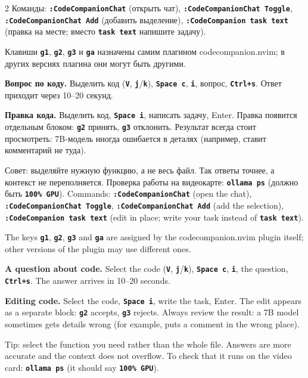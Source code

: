 \documentclass[10pt]{article}
\newcommand{\RU}{\selectlanguage{russian}}
\newcommand{\EN}{\selectlanguage{english}}
\newcommand{\key}[1]{\texttt{\bfseries #1}}
\begin{document}
\begin{paracol}{2}
\RU
Команды: \key{:CodeCompanionChat} (открыть чат), \key{:CodeCompanionChat Toggle}, \key{:CodeCompanionChat Add} (добавить выделение), \key{:CodeCompanion task text} (правка на месте; вместо \key{task text} напишите задачу).

Клавиши \key{g1}, \key{g2}, \key{g3} и \key{ga} назначены самим плагином codecompanion.nvim; в других версиях плагина они могут быть другими.

\textbf{Вопрос по коду.} Выделить код (\key{V}, \key{j}/\key{k}), \key{Space c}, \key{i}, вопрос, \key{Ctrl+s}. Ответ приходит через 10--20 секунд.

\textbf{Правка кода.} Выделить код, \key{Space i}, написать задачу, Enter. Правка появится отдельным блоком: \key{g2} принять, \key{g3} отклонить. Результат всегда стоит просмотреть: 7B-модель иногда ошибается в деталях (например, ставит комментарий не туда).

Совет: выделяйте нужную функцию, а не весь файл. Так ответы точнее, а контекст не переполняется. Проверка работы на видеокарте: \key{ollama ps} (должно быть \key{100\% GPU}).
\switchcolumn
\EN
Commands: \key{:CodeCompanionChat} (open the chat), \key{:CodeCompanionChat Toggle}, \key{:CodeCompanionChat Add} (add the selection), \key{:CodeCompanion task text} (edit in place; write your task instead of \key{task text}).

The keys \key{g1}, \key{g2}, \key{g3} and \key{ga} are assigned by the codecompanion.nvim plugin itself; other versions of the plugin may use different ones.

\textbf{A question about code.} Select the code (\key{V}, \key{j}/\key{k}), \key{Space c}, \key{i}, the question, \key{Ctrl+s}. The answer arrives in 10--20 seconds.

\textbf{Editing code.} Select the code, \key{Space i}, write the task, Enter. The edit appears as a separate block: \key{g2} accepts, \key{g3} rejects. Always review the result: a 7B model sometimes gets details wrong (for example, puts a comment in the wrong place).

Tip: select the function you need rather than the whole file. Answers are more accurate and the context does not overflow. To check that it runs on the video card: \key{ollama ps} (it should say \key{100\% GPU}).
\end{paracol}
\end{document}
